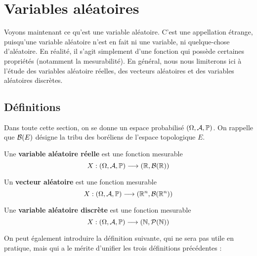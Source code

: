 \documentclass[../integ-proba.tex]{subfiles}
\begin{document}
    \chapter{Variables aléatoires}

    Voyons maintenant ce qu'est une variable aléatoire.
    C'est une appellation étrange, puisqu'une variable aléatoire n'est en fait ni une variable, ni quelque-chose d'aléatoire.
    En réalité, il s'agit simplement d'une fonction qui possède certaines propriétés (notamment la mesurabilité).
    En général, nous nous limiterons ici à l'étude des variables aléatoire réelles, des vecteurs aléatoires et des variables aléatoires discrètes.

    \section{Définitions}

    Dans toute cette section, on se donne un espace probabilisé $\left(\Omega, \mathcal{A}, \mathbb{P}\right)$.
    On rappelle que $\mathcal{B}(E)$ désigne la tribu des boréliens de l'espace topologique $E$.

    \begin{defi}
        Une \textbf{variable aléatoire réelle} est une fonction mesurable
        \begin{displaymath}
            X:\left(\Omega, \mathcal{A}, \mathbb{P}\right) \longrightarrow \left(\mathbb{R}, \mathcal{B}(\mathbb{R})\right)
        \end{displaymath}
    \end{defi}

    \begin{defi}
        Un \textbf{vecteur aléatoire} est une fonction mesurable
        \begin{displaymath}
          X:\left(\Omega, \mathcal{A}, \mathbb{P}\right) \longrightarrow \left(\mathbb{R}^n, \mathcal{B}(\mathbb{R}^n)\right)
        \end{displaymath}
    \end{defi}

    \begin{defi}
        \label{defi:variables_aleatoires_discretes}
        Une \textbf{variable aléatoire discrète} est une fonction mesurable
        \begin{displaymath}
          X:\left(\Omega, \mathcal{A}, \mathbb{P}\right) \longrightarrow \left(\mathbb{N}, \mathcal{P}(\mathbb{N})\right)
        \end{displaymath}
    \end{defi}

    On peut également introduire la définition suivante, qui ne sera pas utile en pratique, mais qui a le mérite d'unifier les trois définitions précédentes :
\end{document}
